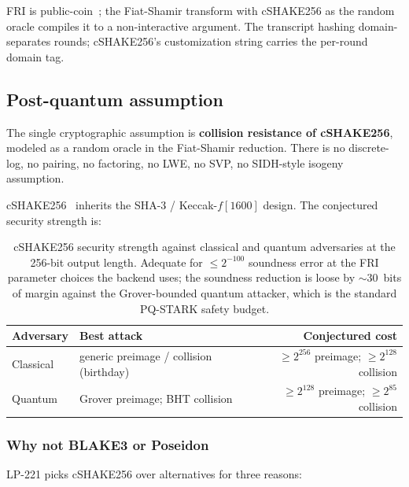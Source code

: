 FRI is public-coin~\cite{frieprint}; the Fiat-Shamir transform
with cSHAKE256 as the random oracle compiles it to a
non-interactive argument. The transcript hashing
domain-separates rounds; cSHAKE256's customization string carries
the per-round domain tag.

\subsection{Post-quantum assumption}

The single cryptographic assumption is \textbf{collision resistance
of cSHAKE256}, modeled as a random oracle in the Fiat-Shamir
reduction. There is no discrete-log, no pairing, no factoring, no
LWE, no SVP, no SIDH-style isogeny assumption.

cSHAKE256~\cite{fips202,sp800185} inherits the SHA-3 / Keccak-$f[1600]$
design. The conjectured security strength is:

\begin{table}[h]
\centering
\small
\begin{tabular}{@{}llr@{}}
\toprule
\textbf{Adversary} & \textbf{Best attack} & \textbf{Conjectured cost} \\
\midrule
Classical & generic preimage / collision (birthday) & $\ge 2^{256}$ preimage; $\ge 2^{128}$ collision \\
Quantum   & Grover preimage; BHT collision           & $\ge 2^{128}$ preimage; $\ge 2^{85}$ collision \\
\bottomrule
\end{tabular}
\caption{cSHAKE256 security strength against classical and quantum
adversaries at the 256-bit output length. Adequate for
$\le 2^{-100}$ soundness error at the FRI parameter choices the
backend uses; the soundness reduction is loose by $\sim$$30$~bits
of margin against the Grover-bounded quantum attacker, which is
the standard PQ-STARK safety budget.}
\label{tab:cshake-strength}
\end{table}

\subsubsection{Why not BLAKE3 or Poseidon}

LP-221 picks cSHAKE256 over alternatives for three reasons:

